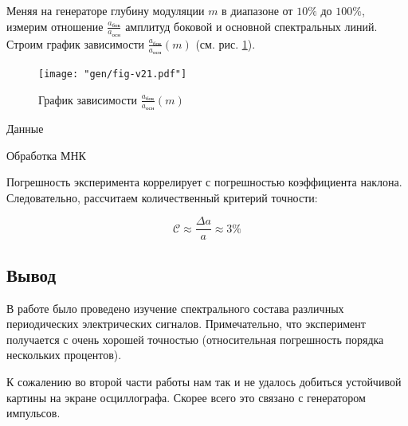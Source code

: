 \documentclass[12pt,a4paper]{article}
\begin{document}
Меняя на генераторе глубину модуляции $m$ в диапазоне от $10\%$ до
$100\%$, измерим отношение $\frac{a_{\text{бок}}}{a_{\text{осн}}}$ амплитуд боковой и основной спектральных линий. Строим график зависимости $\frac{a_{\text{бок}}}{a_{\text{осн}}}(m)$ (см. рис. \ref{fig:v21}).

\noindent \begin{minipage}[B]{.5\textwidth}
	\begin{figure}[H]
		\centering
		\texttt{[image: "gen/fig-v21.pdf"]}
		\label{fig:v21}
		\caption{График зависимости $\frac{a_{\text{бок}}}{a_{\text{осн}}}(m)$}
	\end{figure}
\end{minipage}%
\begin{minipage}[B]{.5\textwidth}
	\begin{table}[H]
		\footnotesize
		
		\caption{Данные}
		\label{tab:v21}
	\end{table}
\end{minipage}

\begin{table}[H]
	\footnotesize
	
	\caption{Обработка МНК}
	\label{tab:v21-mnk}
\end{table}

Погрешность эксперимента коррелирует с погрешностью коэффициента наклона. Следовательно, рассчитаем количественный критерий точности:

$$\mathcal{C} \approx \frac{\Delta a}{a} \approx 3 \% $$

\subsection*{Вывод}

В работе было проведено изучение спектрального состава различных периодических электрических сигналов. Примечательно, что эксперимент получается с очень хорошей точностью (относительная погрешность порядка нескольких процентов). 

К сожалению во второй части работы нам так и не удалось добиться устойчивой картины на экране осциллографа. Скорее всего это связано с генератором импульсов.
	
\end{document}
